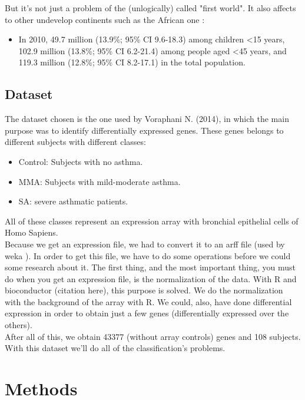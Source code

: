 \documentclass[conference,a4paper]{IEEEtran}
\begin{document}
But it's not just a problem of the (unlogically) called "first world". It also affects to other undevelop continents such as the African one \cite{asthmaAfrica}:

\begin{itemize}
	\item In 2010, 49.7 million (13.9\%; 95\% CI 9.6-18.3) among children <15 years, 102.9 million (13.8\%; 95\% CI 6.2-21.4) among people aged <45 years, and 119.3 million (12.8\%; 95\% CI 8.2-17.1) in the total population.
\end{itemize}


\subsection{Dataset}

The dataset chosen is the one used by Voraphani N. (2014)\cite{voraphani2014}, in which the main purpose was to identify differentially expressed genes. These genes belongs to different subjects with different classes:

\begin{itemize}
	\item Control: Subjects with no asthma.
	
	\item MMA: Subjects with mild-moderate asthma.
	
	\item SA: severe asthmatic patients.
\end{itemize}

All of these classes represent an expression array with bronchial epithelial cells of Homo Sapiens.
\\
Because we get an expression file, we had to convert it to an arff file (used by weka \cite{weka}). In order to get this file, we have to do some operations before we could some research about it. The first thing, and the most important thing, you must do when you get an expression file, is the normalization of the data. With R and bioconductor \cite{bionductor} (citation here), this purpose is solved. We do the normalization with the background of the array with R.
We could, also, have done differential expression in order to obtain just a few genes (differentially expressed over the others).
\\
After all of this, we obtain 43377 (without array controls) genes and 108 subjects. With this dataset we'll do all of the classification's problems.

\section{Methods}
\end{document}

